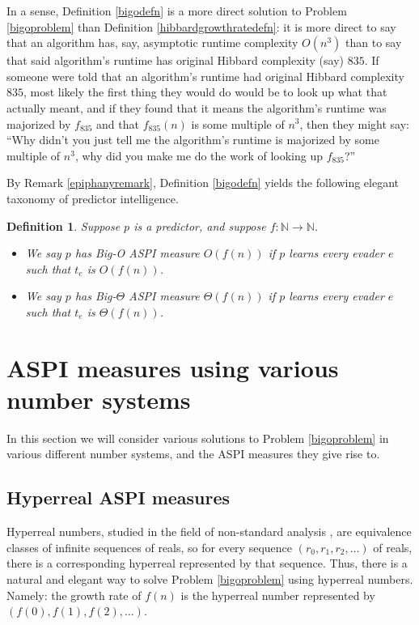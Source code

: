 \documentclass{article}
\newtheorem{definition}[theorem]{Definition}
\begin{document}
In a sense, Definition \ref{bigodefn} is a more direct solution to
Problem \ref{bigoproblem} than Definition \ref{hibbardgrowthratedefn}:
it is more direct to say that an algorithm has, say, asymptotic runtime
complexity $O(n^3)$ than to say that said algorithm's runtime has original
Hibbard complexity (say) $835$. If someone were told that an algorithm's runtime
had original Hibbard complexity $835$, most likely the first thing they would do
would be to look up what that actually meant, and if they found that it means the
algorithm's runtime was majorized by $f_{835}$ and that $f_{835}(n)$ is some
multiple of $n^3$, then
they might say: ``Why didn't you just tell me the algorithm's runtime is
majorized by some multiple of
$n^3$, why did you make me do the work of looking up $f_{835}$?''

By Remark \ref{epiphanyremark}, Definition \ref{bigodefn} yields the following elegant
taxonomy of predictor intelligence.

\begin{definition}
\label{bigointelligencedefn}
    Suppose $p$ is a predictor, and suppose $f:\mathbb N\to\mathbb N$.
    \begin{itemize}
        \item
        We say \emph{$p$ has Big-O ASPI measure $O(f(n))$} if
        $p$ learns every evader $e$ such that $t_e$ is $O(f(n))$.
        \item
        We say \emph{$p$ has Big-$\Theta$ ASPI measure $\Theta(f(n))$} if
        $p$ learns every evader $e$ such that $t_e$ is $\Theta(f(n))$.
    \end{itemize}
\end{definition}

\section{ASPI measures using various number systems}
\label{exoticsection}

In this section we will consider various solutions to
Problem \ref{bigoproblem} in various different number systems,
and the ASPI measures they give rise to.

\subsection{Hyperreal ASPI measures}

Hyperreal numbers, studied in the field of non-standard analysis \cite{robinson}
\cite{goldblatt2012lectures},
are equivalence classes of infinite sequences of reals,
so for every sequence $(r_0,r_1,r_2,\ldots)$ of reals, there is a corresponding
hyperreal represented by that sequence.
Thus, there is a natural and elegant way to solve Problem \ref{bigoproblem}
using hyperreal numbers. Namely: the growth rate of $f(n)$ is the hyperreal number
represented by $(f(0),f(1),f(2),\ldots)$.
\end{document}

